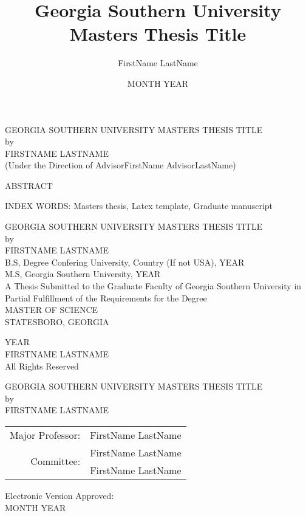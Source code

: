 \documentclass[11pt]{report}
\title{Georgia Southern University Masters Thesis Title}
\author{FirstName LastName}
\date{MONTH YEAR}
\begin{document}
\begin{titlepage}
\begin{center}
\uppercase{Georgia Southern University Masters Thesis Title} \\
\bigskip
by \\
\bigskip
\uppercase{FirstName LastName} \\
\bigskip
(Under the Direction of AdvisorFirstName AdvisorLastName)
\bigskip
\end{center}
\begin{center}
\uppercase{Abstract}
\end{center}
\lipsum[2-2]

\bigskip
\noindent
\uppercase{Index Words}: Masters thesis, Latex template, Graduate manuscript
\end{titlepage}

\newpage
\begin{center}
\uppercase{Georgia Southern University Masters Thesis Title} \\
\bigskip
by \\
\bigskip
\uppercase{FirstName LastName} \\
\bigskip
B.S, Degree Confering University, Country (If not USA), YEAR \\
M.S, Georgia Southern University, YEAR \\
\bigskip
A Thesis Submitted to the Graduate Faculty of Georgia Southern University in Partial Fulfillment of the Requirements for the Degree \\
\bigskip
\uppercase{MASTER OF SCIENCE} \\
\bigskip
\uppercase{STATESBORO, GEORGIA}
\end{center}

\newpage
\null\vfill
\begin{center}
\textcopyright \space YEAR \\
\bigskip
\uppercase{FirstName LastName} \\
\bigskip
All Rights Reserved
\end{center}

\newpage
\begin{center}
\uppercase{Georgia Southern University Masters Thesis Title} \\
\bigskip
by \\
\bigskip
\uppercase{FirstName LastName} \\
\end{center}

\vspace*{\fill}
\begin{center}
\begin{tabular}{rl}
Major Professor: 			   & FirstName LastName \\
\multirow[t]{2}{*}{Committee:} & FirstName LastName \\
							   & FirstName LastName
\end{tabular}
\end{center}
\vspace*{\fill}
\bigskip
Electronic Version Approved: \\
MONTH YEAR
\end{document}
